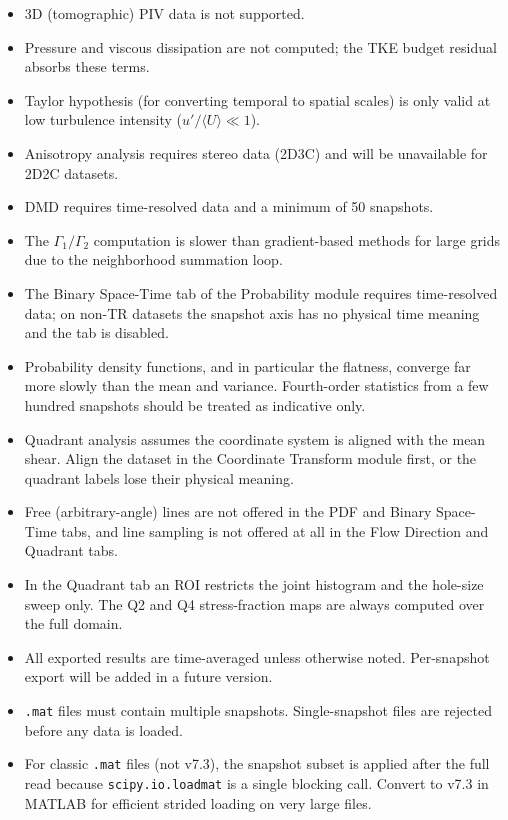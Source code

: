 \documentclass[11pt, a4paper]{report}
\begin{document}
\begin{itemize}[leftmargin=1.5em]
  \item 3D (tomographic) PIV data is not supported.
  \item Pressure and viscous dissipation are not computed; the TKE budget residual absorbs these terms.
  \item Taylor hypothesis (for converting temporal to spatial scales) is only valid at low turbulence intensity ($u'/\langle U\rangle \ll 1$).
  \item Anisotropy analysis requires stereo data (2D3C) and will be unavailable for 2D2C datasets.
  \item DMD requires time-resolved data and a minimum of 50 snapshots.
  \item The $\Gamma_1/\Gamma_2$ computation is slower than gradient-based methods for large grids due to the neighborhood summation loop.
  \item The Binary Space-Time tab of the Probability module requires time-resolved data; on non-TR datasets the snapshot axis has no physical time meaning and the tab is disabled.
  \item Probability density functions, and in particular the flatness, converge far more slowly than the mean and variance. Fourth-order statistics from a few hundred snapshots should be treated as indicative only.
  \item Quadrant analysis assumes the coordinate system is aligned with the mean shear. Align the dataset in the Coordinate Transform module first, or the quadrant labels lose their physical meaning.
  \item Free (arbitrary-angle) lines are not offered in the PDF and Binary Space-Time tabs, and line sampling is not offered at all in the Flow Direction and Quadrant tabs.
  \item In the Quadrant tab an ROI restricts the joint histogram and the hole-size sweep only. The Q2 and Q4 stress-fraction maps are always computed over the full domain.
  \item All exported results are time-averaged unless otherwise noted. Per-snapshot export will be added in a future version.
  \item \texttt{.mat} files must contain multiple snapshots. Single-snapshot files are rejected before any data is loaded.
  \item For classic \texttt{.mat} files (not v7.3), the snapshot subset is applied after the full read because \texttt{scipy.io.loadmat} is a single blocking call. Convert to v7.3 in MATLAB for efficient strided loading on very large files.
\end{itemize}
\end{document}

